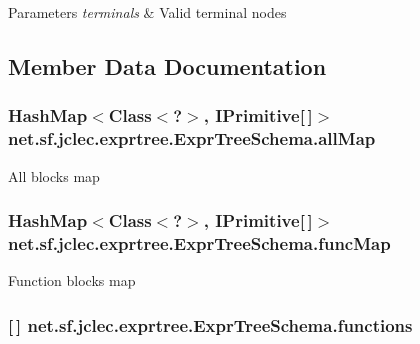 \begin{DoxyParams}{Parameters}
{\em terminals} & Valid terminal nodes \\
\hline
\end{DoxyParams}


\subsection{Member Data Documentation}
\hypertarget{classnet_1_1sf_1_1jclec_1_1exprtree_1_1_expr_tree_schema_a5b9a3597e40853603084bd67a4b5a09d}{
\subsubsection[{all\-Map}]{\setlength{\rightskip}{0pt plus 5cm}Hash\-Map$<$Class$<$?$>$, {\bf I\-Primitive}\mbox{[}$\,$\mbox{]}$>$ net.\-sf.\-jclec.\-exprtree.\-Expr\-Tree\-Schema.\-all\-Map\hspace{0.3cm}{\ttfamily [protected]}}}\label{classnet_1_1sf_1_1jclec_1_1exprtree_1_1_expr_tree_schema_a5b9a3597e40853603084bd67a4b5a09d}
All blocks map \hypertarget{classnet_1_1sf_1_1jclec_1_1exprtree_1_1_expr_tree_schema_aadf3e30ac3d79e7b5dfae0e0caf7d658}{
\subsubsection[{func\-Map}]{\setlength{\rightskip}{0pt plus 5cm}Hash\-Map$<$Class$<$?$>$, {\bf I\-Primitive}\mbox{[}$\,$\mbox{]}$>$ net.\-sf.\-jclec.\-exprtree.\-Expr\-Tree\-Schema.\-func\-Map\hspace{0.3cm}{\ttfamily [protected]}}}\label{classnet_1_1sf_1_1jclec_1_1exprtree_1_1_expr_tree_schema_aadf3e30ac3d79e7b5dfae0e0caf7d658}
Function blocks map \hypertarget{classnet_1_1sf_1_1jclec_1_1exprtree_1_1_expr_tree_schema_aca234d53fec87216b84803146e1b23c6}{
\subsubsection[{functions}]{ \mbox{[}$\,$\mbox{]} net.\-sf.\-jclec.\-exprtree.\-Expr\-Tree\-Schema.\-functions\hspace{0.3cm}{\ttfamily [protected]}}}\label{classnet_1_1sf_1_1jclec_1_1exprtree_1_1_expr_tree_schema_aca234d53fec87216b84803146e1b23c6}
